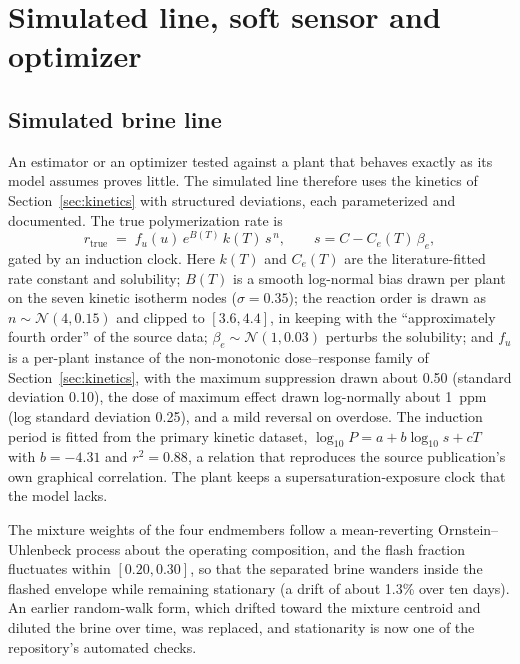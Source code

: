 \section{Simulated line, soft sensor and optimizer}\label{sec:methods}

\subsection{Simulated brine line}\label{sec:plant}

An estimator or an optimizer tested against a plant that behaves
exactly as its model assumes proves little. The simulated line
therefore uses the kinetics of Section~\ref{sec:kinetics} with
structured deviations, each parameterized and documented. The true
polymerization rate is
\begin{equation}\label{eq:truth}
r_{\mathrm{true}} \;=\; f_u(u)\, e^{B(T)}\, k(T)\, s^{\,n},
\qquad s = C - C_e(T)\,\beta_e ,
\end{equation}
gated by an induction clock. Here $k(T)$ and $C_e(T)$ are the
literature-fitted rate constant and solubility; $B(T)$ is a smooth
log-normal bias drawn per plant on the seven kinetic isotherm nodes
($\sigma = 0.35$); the reaction order is drawn as
$n \sim \mathcal{N}(4, 0.15)$ and clipped to $[3.6, 4.4]$, in keeping
with the ``approximately fourth order'' of the source data;
$\beta_e \sim \mathcal{N}(1, 0.03)$ perturbs the solubility; and $f_u$
is a per-plant instance of the non-monotonic dose--response family of
Section~\ref{sec:kinetics}, with the maximum suppression drawn about
0.50 (standard deviation 0.10), the dose of maximum effect drawn
log-normally about 1~ppm (log standard deviation 0.25), and a mild
reversal on overdose. The induction period is fitted from the primary
kinetic dataset, $\log_{10} P = a + b \log_{10} s + cT$ with
$b = -4.31$ and $r^2 = 0.88$, a relation that reproduces the source
publication's own graphical correlation. The plant keeps a
supersaturation-exposure clock that the model lacks.

The mixture weights of the four endmembers follow a mean-reverting
Ornstein--Uhlenbeck process about the operating composition, and the
flash fraction fluctuates within $[0.20, 0.30]$, so that the separated
brine wanders inside the flashed envelope while remaining stationary
(a drift of about 1.3\% over ten days). An earlier random-walk form,
which drifted toward the mixture centroid and diluted the brine over
time, was replaced, and stationarity is now one of the repository's
automated checks.

